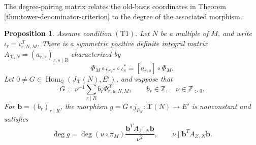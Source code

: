 \documentclass[12pt, letterpaper]{amsart}
\newtheorem{proposition}[theorem]{Proposition}
\theoremstyle{definition}
\theoremstyle{remark}
\newcommand{\Q}{\mathbb Q}
\newcommand{\Z}{\mathbb Z}
\newcommand{\Hom}{\operatorname{Hom}}
\numberwithin{equation}{section}
\begin{document}
The degree-pairing matrix relates the old-basis coordinates in
Theorem \ref{thm:tower-denominator-criterion} to the degree of the associated
morphism.

\begin{proposition}\label{prop:tower-degree-matrix}
Assume condition \hyperlink{tower-condition-T1}{\(\mathrm{(T1)}\)}. Let \(N\) be a multiple of \(M\), and write
\(\iota_r=\iota^{\mathcal X}_{r,N,M}\). There is a symmetric positive
definite integral matrix
\(A_{\mathcal X,N}=(a_{r,s})_{r,s\mid R}\) characterized by
\[
        \Phi_M\circ\iota_{r,*}\circ\iota_s^*
        =
        [a_{r,s}]\circ\Phi_M.
\]
Let \(0\ne G\in\Hom_\Q(J_{\mathcal X}(N),E')\), and suppose that
\[
        G=\nu^{-1}\sum_{r\mid R}b_r\Phi^{\mathcal X}_{r,u,N,M},
        \qquad b_r\in\Z,\quad \nu\in\Z_{>0}.
\]
For \(\boldsymbol b=(b_r)_{r\mid R}\), the morphism
\(g=G\circ j_{P_N}:\mathcal X(N)\to E'\) is nonconstant and satisfies
\begin{equation}\label{eq:tower-degree-and-first-denominator}
        \deg g=
        \deg(u\circ\pi_M)
        \frac{\boldsymbol b^{T}A_{\mathcal X,N}\boldsymbol b}{\nu^2},
        \qquad
        \nu\mid\boldsymbol b^{T}A_{\mathcal X,N}\boldsymbol b.
\end{equation}
\end{proposition}
\end{document}
